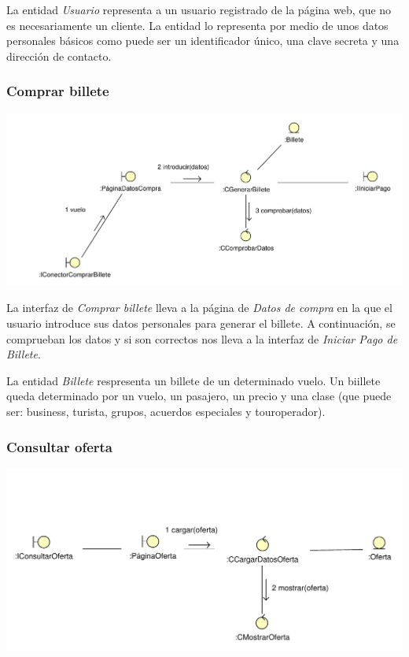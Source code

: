 \documentclass[11pt, a4paper, twoside, titlepage]{article}
\begin{document}
				La entidad {\itshape Usuario} representa a un usuario registrado de la página web, que no es necesariamente un cliente. La entidad lo representa por medio de unos datos personales básicos como puede ser un identificador único, una clave secreta y una dirección de contacto.


			\subsubsection{Comprar billete}
				\begin{center}
					\includegraphics[scale=.72]{analisis/diagramas/comprarbillete.pdf}
				\end{center}
					
					La interfaz  de {\itshape Comprar billete} lleva a la página de {\itshape Datos de compra} en la que el usuario introduce sus datos personales para generar el billete. A continuación, se comprueban los datos y si son correctos nos lleva a la interfaz de {\itshape Iniciar Pago de Billete}.

					La entidad {\itshape Billete} respresenta un billete de un determinado vuelo. Un biillete queda determinado por un vuelo, un pasajero, un precio y una clase (que puede ser:  business, turista, grupos, acuerdos especiales y touroperador).


			\subsubsection{Consultar oferta}
				\begin{center}
					\includegraphics[scale=.85]{analisis/diagramas/consultaroferta.pdf}
				\end{center}
					
\end{document}
